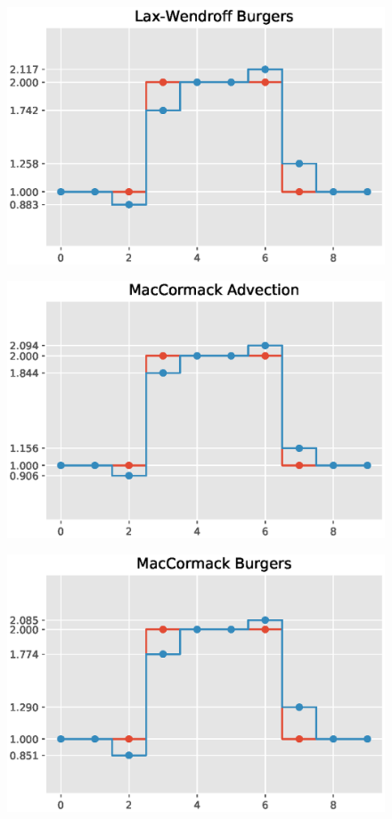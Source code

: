 \documentclass{article}
\begin{document}
  \begin{figure}[H]
  \centering
  \includegraphics[width=1\linewidth]{pics/Wendroffburger.eps}
  \label{fig:perf}
 \end{figure}

\begin{figure}[H]
  \centering
  \includegraphics[width=1\linewidth]{pics/Maccormackadvection.eps}
  \label{fig:perf}
 \end{figure}

 \begin{figure}[H]
  \centering
  \includegraphics[width=1\linewidth]{pics/Maccormackburgers.eps}
  \label{fig:perf}
 \end{figure}
\end{document}
